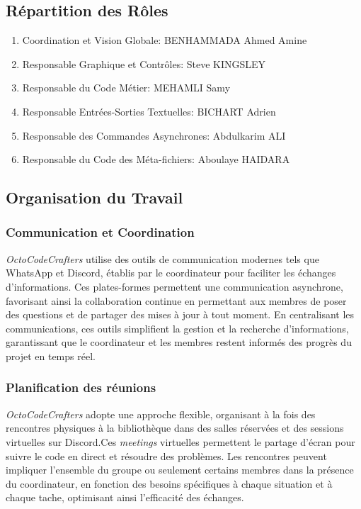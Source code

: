 \documentclass{article}
\begin{document}
\subsection{Répartition des Rôles}
\begin{enumerate}
    \item Coordination et Vision Globale: BENHAMMADA Ahmed Amine
    \item Responsable Graphique et Contrôles: Steve KINGSLEY
    \item Responsable du Code Métier: MEHAMLI Samy
    \item Responsable Entrées-Sorties Textuelles: BICHART Adrien
    \item Responsable des Commandes Asynchrones: Abdulkarim ALI
    \item Responsable du Code des Méta-fichiers: Aboulaye HAIDARA
\end{enumerate}
\subsection{Organisation du Travail}
\subsubsection{Communication et Coordination}
\textit{OctoCodeCrafters} utilise des outils de communication modernes tels que WhatsApp et Discord, établis par le coordinateur pour faciliter les échanges d'informations. Ces plates-formes permettent une communication asynchrone, favorisant ainsi la collaboration continue en permettant aux membres de poser des questions et de partager des mises à jour à tout moment. En centralisant les communications, ces outils simplifient la gestion et la recherche d'informations, garantissant que le coordinateur et les membres restent informés des progrès du projet en temps réel.
\subsubsection{Planification des réunions}
\textit{OctoCodeCrafters} adopte une approche flexible, organisant à la fois des rencontres physiques à la bibliothèque dans des salles réservées et des sessions virtuelles sur Discord.Ces \textit{meetings}    virtuelles permettent le partage d'écran pour suivre le code en direct et résoudre des problèmes. Les rencontres peuvent impliquer l'ensemble du groupe ou seulement certains membres dans la présence du coordinateur, en fonction des besoins spécifiques à chaque situation et à chaque tache, optimisant ainsi l'efficacité des échanges.
\end{document}
